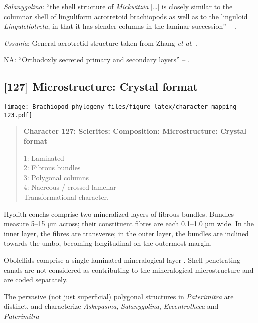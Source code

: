 \documentclass[openany]{book}
\theoremstyle{definition}
\theoremstyle{definition}
\theoremstyle{definition}
\theoremstyle{remark}
\begin{document}
\hypertarget{Salanygolina-coding-126}{}
\emph{Salanygolina}: ``the shell structure of \emph{Mickwitzia}
{[}\ldots{}{]} is closely similar to the columnar shell of linguliform
acrotretoid brachiopods as well as to the linguloid
\emph{Lingulellotreta}, in that it has slender columns in the laminar
succession'' -- \citet{Williams2007Supplement}.

\hypertarget{Ussunia-coding-126}{}
\emph{Ussunia}: General acrotretid structure taken from Zhang \emph{et
al}. \citeyearpar{Zhang2016Epithelialcell}.

\hypertarget{NA-coding-126}{}
NA: ``Orthodoxly secreted primary and secondary layers'' --
\citet{Williams2004Chemicostructure}.

\subsection*{{[}127{]} Microstructure: Crystal
format}\label{microstructure-crystal-format}

\texttt{[image: Brachiopod\_phylogeny\_files/figure-latex/character-mapping-123.pdf]}

\begin{quote}
\textbf{Character 127: Sclerites: Composition: Microstructure: Crystal
format}

1: Laminated\\
2: Fibrous bundles\\
3: Polygonal columns\\
4: Nacreous / crossed lamellar\\
Transformational character.
\end{quote}

Hyolith conchs comprise two mineralized layers of fibrous bundles.
Bundles measure 5--15 μm across; their constituent fibres are each
0.1--1.0 µm wide. In the inner layer, the fibres are transverse; in the
outer layer, the bundles are inclined towards the umbo, becoming
longitudinal on the outermost margin.

Obolellids comprise a single laminated mineralogical layer
\citep{Balthasar2008iMummpikia}. Shell-penetrating canals are not
considered as contributing to the mineralogical microstructure and are
coded separately.

The pervasive (not just superficial) polygonal structures in
\emph{Paterimitra} are distinct, and characterize \emph{Askepasma},
\emph{Salanygolina}, \emph{Eccentrotheca} and \emph{Paterimitra}
\citep{Larsson2014iPaterimitra}
\end{document}
